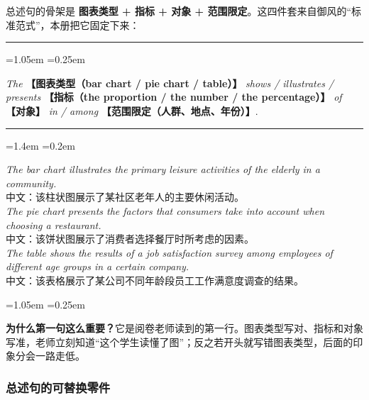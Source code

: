 \documentclass[11pt,a4paper]{ctexart}
\newcommand{\fillin}[1]{{\bfseries【#1】}}
\newcommand{\en}[1]{\textit{#1}}
\newenvironment{tpl}[1]{%
  \par\addvspace{7pt}\needspace{4\baselineskip}%
  \noindent{\bfseries\color{accent}#1}\par\nopagebreak
  \vspace{2pt}\noindent\rule{\linewidth}{0.7pt}\par\nopagebreak\vspace{3pt}%
  \begin{list}{}{\leftmargin=1.05em \rightmargin=0.25em \listparindent=0pt
    \itemindent=0pt \topsep=0pt \parsep=2.5pt \itemsep=2.5pt \partopsep=0pt}%
  \item\relax
}{%
  \end{list}\vspace{1pt}\noindent\rule{\linewidth}{0.7pt}\par\addvspace{8pt}%
}
\newenvironment{note}{%
  \par\addvspace{5pt}%
  \begin{list}{}{\leftmargin=1.05em \rightmargin=0.25em \listparindent=0pt
    \itemindent=0pt \topsep=0pt \parsep=2pt \itemsep=2pt \partopsep=0pt}%
  \item\relax\small\color{ink}%
}{%
  \end{list}\addvspace{5pt}%
}
\newenvironment{eg}{%
  \par\addvspace{4pt}%
  \begin{list}{}{\leftmargin=1.4em \rightmargin=0.2em \listparindent=0pt
    \itemindent=0pt \topsep=0pt \parsep=2pt \itemsep=2pt \partopsep=0pt}%
  \item\relax
}{%
  \end{list}\addvspace{5pt}%
}
\begin{document}
总述句的骨架是 \textbf{图表类型 + 指标 + 对象 + 范围限定}。这四件套来自御风的“标准范式”，本册把它固定下来：

\begin{tpl}{总述句公式}
\en{The} \fillin{图表类型（bar chart / pie chart / table）} \en{shows / illustrates / presents} \fillin{指标（the proportion / the number / the percentage）} \en{of} \fillin{对象} \en{in / among} \fillin{范围限定（人群、地点、年份）}.
\end{tpl}

\begin{eg}
\en{The bar chart illustrates the primary leisure activities of the elderly in a community.}\\
中文：该柱状图展示了某社区老年人的主要休闲活动。\\[3pt]
\en{The pie chart presents the factors that consumers take into account when choosing a restaurant.}\\
中文：该饼状图展示了消费者选择餐厅时所考虑的因素。\\[3pt]
\en{The table shows the results of a job satisfaction survey among employees of different age groups in a certain company.}\\
中文：该表格展示了某公司不同年龄段员工工作满意度调查的结果。
\end{eg}

\begin{note}
\textbf{为什么第一句这么重要？}它是阅卷老师读到的第一行。图表类型写对、指标和对象写准，老师立刻知道“这个学生读懂了图”；反之若开头就写错图表类型，后面的印象分会一路走低。
\end{note}

\subsubsection{总述句的可替换零件}
\end{document}
